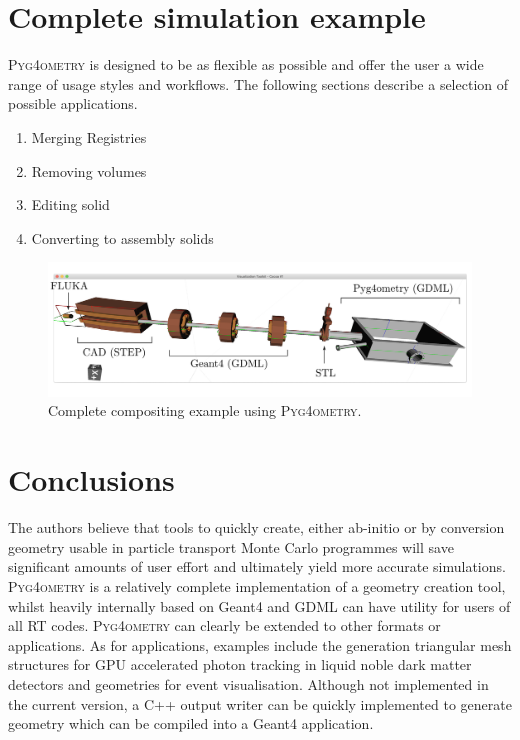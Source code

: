 \documentclass[final,5p,times,twocolumn]{elsarticle}
\newcommand{\PYGEOMETRY}{\textsc{Pyg4ometry}}
\begin{document}
\section{Complete simulation example}
\PYGEOMETRY{} is designed to be as flexible as possible and offer the user a wide range of usage styles 
and workflows. The following sections describe a selection of 
possible applications.
%
\begin{enumerate}
\item Merging Registries 
\item Removing volumes 
\item Editing solid
\item Converting to assembly solids 
\end{enumerate}
%
\begin{figure}[htb!]
\begin{center}
\includegraphics[width=1.0\textwidth]{./model-scene/model.pdf}
\caption{Complete compositing example using \PYGEOMETRY{}.}
\label{fig:model}
\end{center}
\end{figure}

\section{Conclusions}
The authors believe that tools to quickly create, either ab-initio or by conversion geometry usable in 
particle transport Monte Carlo programmes will save significant amounts of user effort and ultimately 
yield more accurate simulations. \PYGEOMETRY{} is a relatively complete implementation of a geometry 
creation tool, whilst heavily internally based on Geant4 and GDML can have utility for users of all RT 
codes. \PYGEOMETRY{} can clearly be extended to other formats or applications. As for applications, examples 
include  the  generation triangular mesh structures for GPU accelerated photon tracking in liquid noble dark 
matter detectors and geometries for event visualisation. Although not implemented in the current version, 
a C++ output writer can be quickly implemented to generate geometry which can be compiled into a Geant4 
application. 
\end{document}

